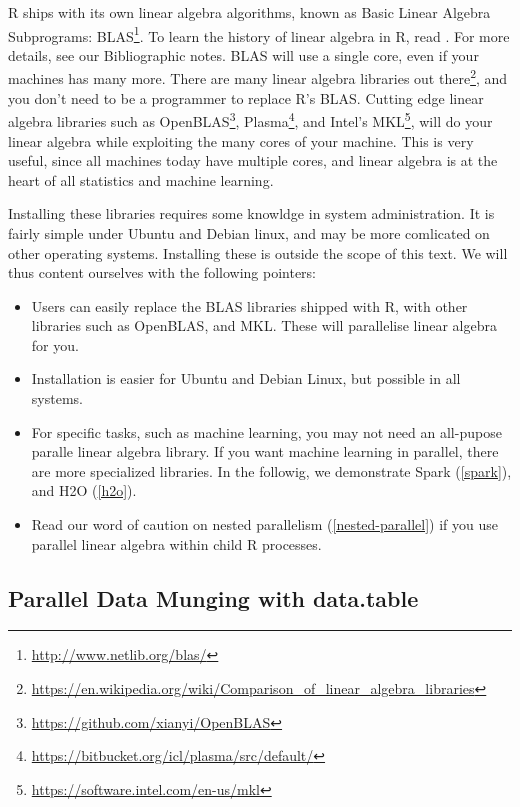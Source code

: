 \documentclass[]{book}
\providecommand{\tightlist}{%
  \setlength{\itemsep}{0pt}\setlength{\parskip}{0pt}}
\renewcommand{\href}[2]{#2\footnote{\url{#1}}}
\theoremstyle{definition}
\theoremstyle{definition}
\theoremstyle{definition}
\theoremstyle{remark}
\begin{document}
R ships with its own linear algebra algorithms, known as Basic Linear Algebra Subprograms: \href{http://www.netlib.org/blas/}{BLAS}.
To learn the history of linear algebra in R, read \citet{maechler20062nd}.
For more details, see our Bibliographic notes.
BLAS will use a single core, even if your machines has many more.
There are many linear algebra libraries \href{https://en.wikipedia.org/wiki/Comparison_of_linear_algebra_libraries}{out there}, and you don't need to be a programmer to replace R's BLAS.
Cutting edge linear algebra libraries such as \href{https://github.com/xianyi/OpenBLAS}{OpenBLAS}, \href{https://bitbucket.org/icl/plasma/src/default/}{Plasma}, and Intel's \href{https://software.intel.com/en-us/mkl}{MKL}, will do your linear algebra while exploiting the many cores of your machine.
This is very useful, since all machines today have multiple cores, and linear algebra is at the heart of all statistics and machine learning.

Installing these libraries requires some knowldge in system administration.
It is fairly simple under Ubuntu and Debian linux, and may be more comlicated on other operating systems.
Installing these is outside the scope of this text.
We will thus content ourselves with the following pointers:

\begin{itemize}
\tightlist
\item
  Users can easily replace the BLAS libraries shipped with R, with other libraries such as OpenBLAS, and MKL. These will parallelise linear algebra for you.
\item
  Installation is easier for Ubuntu and Debian Linux, but possible in all systems.
\item
  For specific tasks, such as machine learning, you may not need an all-pupose paralle linear algebra library. If you want machine learning in parallel, there are more specialized libraries. In the followig, we demonstrate Spark (\ref{spark}), and H2O (\ref{h2o}).
\item
  Read our word of caution on nested parallelism (\ref{nested-parallel}) if you use parallel linear algebra within child R processes.
\end{itemize}

\hypertarget{parallel-data-munging-with-data.table}{%
\subsection{Parallel Data Munging with data.table}\label{parallel-data-munging-with-data.table}}
\end{document}
